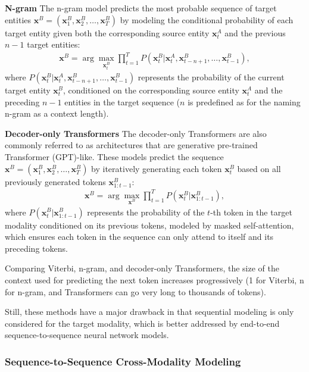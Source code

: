 \documentclass[journal]{IEEEtran}
\begin{document}
\textbf{N-gram} The n-gram model predicts the most probable sequence of target entities $\mathbf{x}^{B} = (\mathbf{x}_1^{B}, \mathbf{x}_2^{B}, \ldots, \mathbf{x}_T^{B})$ by modeling the conditional probability of each target entity given both the corresponding source entity $\mathbf{x}_t^{A}$ and the previous $n-1$ target entities:
\begin{align}
\mathbf{x}^{B} = \arg \max_{\mathbf{x}_t^{B}} \prod_{t=1}^T P(\mathbf{x}_t^{B} | \mathbf{x}_t^{A}, \mathbf{x}_{t-n+1}^{B}, \ldots, \mathbf{x}_{t-1}^{B}),
\end{align}
where $P(\mathbf{x}_t^{B} | \mathbf{x}_t^{A}, \mathbf{x}_{t-n+1}^{B}, \ldots, \mathbf{x}_{t-1}^{B})$ represents the probability of the current target entity $\mathbf{x}_t^{B}$, conditioned on the corresponding source entity $\mathbf{x}_t^{A}$ and the preceding $n-1$ entities in the target sequence ($n$ is predefined as for the naming n-gram as a context length).

\textbf{Decoder-only Transformers} The decoder-only Transformers are also commonly referred to as architectures that are generative pre-trained Transformer (GPT)-like. These models predict the sequence $\mathbf{x}^{B} = (\mathbf{x}_1^{B}, \mathbf{x}_2^{B}, \ldots, \mathbf{x}_T^{B})$ by iteratively generating each token $\mathbf{x}_t^{B}$ based on all previously generated tokens $\mathbf{x}_{1:t-1}^{B}$:
\begin{align}
\mathbf{x}^{B} = \arg \max_{\mathbf{x}^{B}} \prod_{t=1}^{T} P(\mathbf{x}_t^{B} | \mathbf{x}_{1:t-1}^{B}),
\end{align}
where $P(\mathbf{x}_t^{B} | \mathbf{x}_{1:t-1}^{B})$ represents the probability of the \( t \)-th token in the target modality conditioned on its previous tokens, modeled by masked self-attention, which ensures each token in the sequence can only attend to itself and its preceding tokens.

Comparing Viterbi, n-gram, and decoder-only Transformers, the size of the context used for predicting the next token increases progressively (1 for Viterbi, n for n-gram, and Transformers can go very long to thousands of tokens).

Still, these methods have a major drawback in that sequential modeling is only considered for the target modality, which is better addressed by end-to-end sequence-to-sequence neural network models.

\subsubsection{Sequence-to-Sequence Cross-Modality Modeling}
\end{document}
